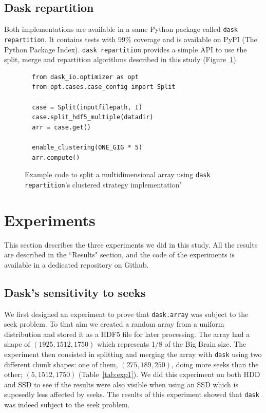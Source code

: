 \documentclass[conference]{IEEEtran}
\begin{document}
\subsection{Dask repartition}

Both implementations are available in a same Python package called \texttt{dask repartition}. It
contains tests with 99\% coverage and is available on PyPI (The Python Package
Index). \texttt{dask repartition} provides a simple API to use the split, merge and repartition
algorithms described in this study (Figure~\ref{fig:daskrepartition_split}).

\begin{figure}
  \begin{verbatim}
  from dask_io.optimizer as opt
  from opt.cases.case_config import Split

  case = Split(inputfilepath, I)
  case.split_hdf5_multiple(datadir)
  arr = case.get()

  enable_clustering(ONE_GIG * 5)
  arr.compute()
  \end{verbatim}
  \caption{Example code to split a multidimensional array using \texttt{dask repartition}'s clustered strategy implementation'}
  \label{fig:daskrepartition_split}
\end{figure}


\section{Experiments}
This section describes the three experiments we did in this study. All the
results are described in the ``Results" section, and the code of the experiments
is available in a dedicated repository on Github.

\subsection{Dask's sensitivity to seeks}
We first designed
an experiment to prove that \texttt{dask.array} was subject to the seek problem.
To that aim we created a random array from a uniform distribution and stored it
as a HDF5 file for later processing. The array had a shape of
$(1925, 1512, 1750)$ which represents 1/8
of the Big Brain size. The experiment then consisted in splitting and merging
the array with \texttt{dask} using two different chunk shapes: one of them,
$(275,189,250)$, doing more seeks than the other; $(5,1512,1750)$
(Table~\ref{tab:exp1}). We did this experiment on both HDD and SSD to see if the
results were also visible when using an SSD which is suposedly less affected by
seeks. The results of this experiment showed that \texttt{dask} was indeed
subject to the seek problem.
\end{document}
